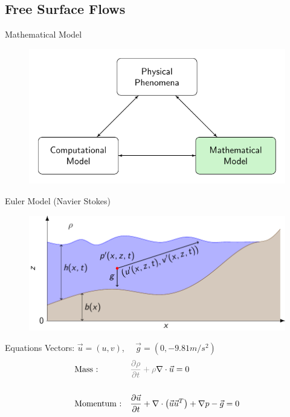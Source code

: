 \documentclass[pdf]{beamer}
\begin{document}
\subsection{Free Surface Flows}
\begin{frame}{Mathematical Model}
	\begin{figure}
		\includegraphics[width=\textwidth]{./Pics/ModelDiagrams/FlowChartHigh2G.pdf}
	\end{figure}
\end{frame}
\begin{frame}{Euler Model (Navier Stokes)}
	\begin{figure}
		\includegraphics[width=\textwidth]{./Pics/WaterModelDiagrams/NavierStokes.pdf}
	\end{figure}
\end{frame}
\begin{frame}{Equations}
	Vectors:
	$\vec{u} = (u,v)$, $\quad \vec{g} = (0,-9.81 m/s^2)$
	\begin{align}
	& \text{Mass :} && {\color{gray} \frac{\partial \rho}{\partial t} + \rho} \nabla \cdot \vec{u} = 0 \\ \nonumber\\
	& \text{Momentum :} && \frac{\partial \vec{u}}{\partial t} + \nabla \cdot \left( \vec{u} \vec{u}^T\right) + \nabla p - \vec{g} = 0
	\end{align}	
\end{frame}
\end{document}
